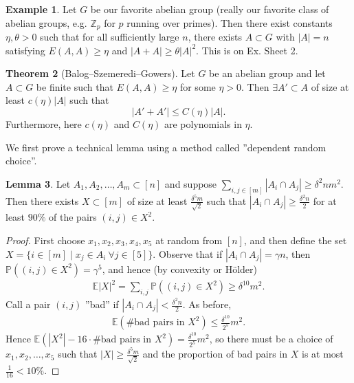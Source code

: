 \documentclass{article}
\theoremstyle{definition}
\newtheorem{theorem}{Theorem}[section]
\newtheorem{lemma}[theorem]{Lemma}
\newtheorem{example}[theorem]{Example}
\begin{document}
\begin{example}
    Let $G$ be our favorite abelian group (really our favorite class of abelian groups, e.g. $\mathbb{Z}_p$ for $p$ running over primes). Then there exist constants $\eta,\theta>0$ such that for all sufficiently large $n$, there exists $A \subset G$ with $\left|A\right| = n$ satisfying $E(A,A) \ge \eta$ and $\left|A+A\right|\ge \theta \left|A\right|^2$. This is on Ex. Sheet 2.
\end{example}
\begin{theorem}[Balog--Szemeredi--Gowers]
    Let $G$ be an abelian group and let $A \subset G$ be finite such that $E(A,A) \ge \eta$ for some $\eta >0$. Then $\exists A' \subset A$ of size at least $c(\eta)\left|A\right|$ such that $$\left|A'+A'\right| \le C(\eta)\left|A\right|.$$
    Furthermore, here $c(\eta)$ and $C(\eta)$ are polynomials in $\eta$.
\end{theorem}
We first prove a technical lemma using a method called ''dependent random choice''. 
\begin{lemma}
    Let $A_1,A_2,\ldots,A_m \subset [n]$ and suppose $\sum_{i,j \in [m]}^{} \left|A_i \cap A_j\right|\ge \delta^2 nm^2$. Then there exists $X \subset [m]$ of size at least $\frac{\delta^5 m}{\sqrt{2}}$ such that $\left|A_i \cap A_j\right|\ge \frac{\delta^2n}{2}$ for at least $90\%$ of the pairs $(i,j) \in X^2$.
\end{lemma}
\begin{proof}
    First choose $x_1,x_2,x_3,x_4,x_5$ at random from $[n]$, and then define the set $X = \{i \in [m] \mid x_j \in A_i ~\forall j \in [5]\}$. Observe that if $\left|A_i \cap A_j\right| = \gamma n$, then $\mathbb{P}\left((i,j) \in X^2\right) = \gamma^5$, and hence (by convexity or Hölder)
    \begin{align*}
        \mathbb{E}\left|X\right|^2 = \sum_{i,j}^{} \mathbb{P}\left((i,j)\in X^2\right) \ge \delta^{10}m^2.
    \end{align*}
    Call a pair $(i,j)$ ''bad'' if $\left|A_i \cap A_j\right| < \frac{\delta^2 n}{2}$. As before,
    \begin{align*}
        \mathbb{E}(\# \text{bad pairs in }X^2) \le \frac{\delta^{10}}{2^5}m^2.
    \end{align*}
    Hence $\mathbb{E}\left(\left|X^2\right| - 16 \cdot \# \text{bad pairs in }X^2\right)=\frac{\delta^{10}}{2^5}m^2$, so there must be a choice of $x_1,x_2,\ldots,x_5$ such that $\left|X\right| \ge  \frac{\delta^5 m}{\sqrt{2}}$ and the proportion of bad pairs in $X$ is at most $\frac{1}{16}< 10\%$.
\end{proof}
\end{document}
